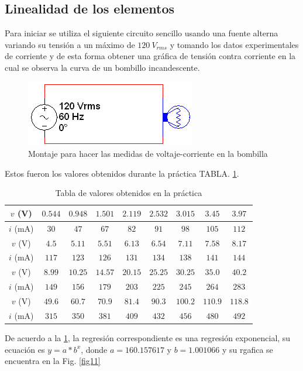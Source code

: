 \documentclass[twocolumn]{IEEEtran}
\begin{document}
\subsection{Linealidad de los elementos}
\noindent
Para iniciar se utiliza el siguiente circuito sencillo usando una fuente  alterna variando su tensión a un máximo de $120 \ V_{rms}$ y tomando los datos experimentales de corriente y de esta forma obtener una gráfica de tensión contra corriente en la cual se observa la curva de un bombillo incandescente.
\begin{figure}[H]
	\centering
		\includegraphics[scale=0.7]{b1.png}
	\caption{Montaje para hacer las medidas de voltaje-corriente en la bombilla}
	\label{fig3}
\end{figure}
\noindent
Estos fueron los valores obtenidos durante la práctica TABLA. \ref{tab1}.
\begin{table}[H]
	\centering
\begin{tabular}[c]{|c||c|c|c|c|c|c|c|c|} \hline
$v$ (V) & $0.544$ & $0.948$ & $1.501$ & $2.119$ & $2.532$ & $3.015$ & $3.45$ & $3.97$ \\ \hline
$i$ (mA) & $30$ & $47$ & $67$ & $82$ & $91$ & $98$ & $105$ & $112$ \\ \hline \hline
$v$ (V) & $4.5$ & $5.11$ & $5.51$ & $6.13$ & $6.54$ & $7.11$ & $7.58$ & $8.17$ \\ \hline
$i$ (mA) & $117$ & $123$ & $126$ & $131$ & $134$ & $138$ & $141$ & $144$ \\ \hline \hline
$v$ (V) & $8.99$ & $10.25$ & $14.57$ & $20.15$ & $25.25$ & $30.25$ & $35.0$ & $40.2$ \\ \hline
$i$ (mA) & $149$ & $156$ & $179$ & $203$ & $225$ & $245$ & $264$ & $283$ \\ \hline
$v$ (V) & $49.6$ & $60.7$ & $70.9$ & $81.4$ & $90.3$ & $100.2$ & $110.9$ & $118.8$ \\ \hline
$i$ (mA) & $315$ & $350$ & $381$ & $409$ & $432$ & $456$ & $480$ & $492$ \\ \hline
\end{tabular}
	\caption{Tabla de valores obtenidos en la práctica}
	\label{tab1}
\end{table}
\noindent
De acuerdo a la \ref{tab1}, la regresión correspondiente es una regresión exponencial, su ecuación es $y = a*{b^x}$, donde $a=160.157617$ y $b=1.001066$ y su rgafica se encuentra en la Fig. \ref{fig11}
\end{document}
